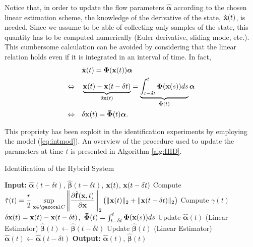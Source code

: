 Notice that, in order to update the flow parameters $\hat{\bm{\alpha}}$ according to the 
% 
{chosen linear estimation scheme}, the knowledge of the derivative of the state, $\dot{\mathbf{x}}(t)$, is needed. Since we assume to be able of collecting only samples of the state, this quantity has to be computed numerically (Euler derivative, sliding mode, etc.). 
This cumbersome calculation can be avoided by considering that the  linear relation holds even if it is integrated in an interval of time. In fact,  %
%
\begin{align}
	&\dot{\mathbf{x}}(t)=\bm{\Phi}(\mathbf{x}(t))\bm{\alpha}\\
	\Leftrightarrow\quad&\underbrace{\mathbf{x}(t)-\mathbf{x}(t-\delta t)}_{\delta\mathbf{x}(t)} = 
	\underbrace{\int_{t-\delta t}^{t}\bm{\Phi}(\mathbf{x}(s))ds}_{\bm{\bar{\Phi}}(t)}\bm{\alpha}\\\label{eq:intmod}
	\Leftrightarrow\quad&\delta\mathbf{x}(t)={\bm{\bar{\Phi}}}(t)\bm{\alpha}.
\end{align}
% 

This propriety has been exploit in the identification experiments by employing the model (\ref{eq:intmod}).
An overview of the procedure used to update the parameters at time $t$ is presented in Algorithm \ref{alg:HID}.
%
\begin{algorithm}[!b]
	\caption{Identification of the Hybrid System}\label{alg:HID}
	\begin{algorithmic}[1]
		\State \textbf{Input:} $\hat{\bm{\alpha}}(t-\delta t)$, $\hat{\bm{\beta}}(t-\delta t)$, $\mathbf{x}(t)$, $\mathbf{x}(t-\delta t)$
		\State Compute $\hat{\tau}(t)=\dfrac{r}{2}\sup\limits_{\x\in\C}\left\|\dfrac{\partial \hat{\mathbf{f}}(\x,t)}{\partial\x}\right\|_2\big(\|\x(t)\|_2+\|\x(t-\delta t)\|_2\big)$
		\State Compute $\gamma(t)$
		\State $\delta\mathbf{x}(t) = \mathbf{x}(t)-\mathbf{x}(t-\delta t)$,~$\bm{\bar{\Phi}}(t)=\int_{t-\delta t}^{t}\bm{\Phi}(\mathbf{x}(s))ds$
		\State Update $\hat{\bm{\alpha}}(t)$ (Linear Estimator)%
		\State $\hat{\bm{\beta}}(t)\gets\hat{\bm{\beta}}(t-\delta t)$
		\Else
		\State Update $\hat{\bm{\beta}}(t)$ (Linear Estimator)%
		\State $\hat{\bm{\alpha}}(t)\gets\hat{\bm{\alpha}}(t-\delta t)$
		\EndIf
		\State \textbf{Output:} $\hat{\bm{\alpha}}(t)$, $\hat{\bm{\beta}}(t)$
	\end{algorithmic}
\end{algorithm}
%
